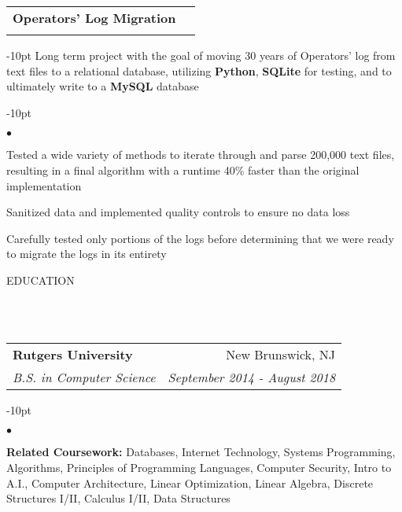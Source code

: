 \documentclass[12pt]{article}
\makeatletter
\newcommand{\header}[1]{
	\vspace*{12pt} %
	{\hspace*{-14pt}\vspace*{6pt} #1}
	\vspace*{-6pt} 
	\lineunder
}
\newcommand{\lineunder}{
	\vspace*{-8pt} \\ 
	\hspace*{-18pt} 
	\hrulefill \\
}
\newcommand{\subheading}[4]{
 	\vspace{5pt}
    	\begin{tabular*}{1.01\textwidth}
    		{l@{\extracolsep{\fill}}r}
      		\hspace{-16pt}\textbf{#1} & #2 \\
      		\hspace{-16pt}\textit{\small#3} & \textit{\small #4} \\
    	\end{tabular*}
    \vspace{-4pt}
}
\newenvironment{achievements}{
\begin{adjustwidth}{-10pt}{}
  \begin{list}{$\bullet$}{
  	\topsep 0pt \itemsep -4pt}}
  	{\vspace*{2pt}\end{list}
\end{adjustwidth}
}
\makeatother
\begin{document}
\subheading{Operators' Log Migration}{}{}{}
	\vspace{-15pt}
	\begin{adjustwidth}{-10pt}{}
	Long term project with the goal of moving 30 years of Operators' log from text files to a relational database, utilizing \textbf{Python}, \textbf{SQLite} for testing, and to ultimately write to a \textbf{MySQL} database
	\end{adjustwidth}
	\begin{achievements}
		\item Tested a wide variety of methods to iterate through and parse 200,000 text files, resulting in a final algorithm with a runtime 40\% faster than the original implementation
		\item Sanitized data and implemented quality controls to ensure no data loss
		\item Carefully tested only portions of the logs before determining that we were ready to migrate the logs in its entirety
	\end{achievements} 

\vspace{-8pt}
\header{EDUCATION}

\subheading
	{Rutgers University}{New Brunswick, NJ}
	{B.S. in Computer Science}{September 2014 - August 2018}
	\begin{achievements}	
	\item{\bf Related Coursework:} Databases, Internet Technology, Systems Programming, Algorithms, Principles of Programming Languages, Computer Security, Intro to A.I., Computer Architecture, Linear Optimization,   Linear Algebra, Discrete Structures I/II, Calculus I/II, Data Structures
	\end{achievements}



	
\end{document}
